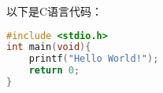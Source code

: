 
以下是C语言代码：
\begin{lstlisting}[language=C]
#include <stdio.h>
int main(void){
    printf("Hello World!");
    return 0;
}
\end{lstlisting}